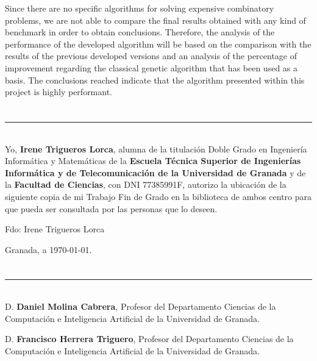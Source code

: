 Since there are no specific algorithms for solving expensive combinatory problems, we are not able to compare the final results obtained with any kind of benchmark in order to obtain conclusions. 
Therefore, the analysis of the performance of the developed algorithm will be based on the comparison with the results of the previous developed versions and an analysis of the percentage of improvement regarding the classical genetic algorithm that has been used as a basis. 
The conclusions reached indicate that the algorithm presented within this project is highly performant.

\chapter*{}
\thispagestyle{empty}

\noindent\rule[-1ex]{\textwidth}{2pt}\\[4.5ex]

Yo, \textbf{Irene Trigueros Lorca}, alumna de la titulación Doble Grado en Ingeniería Informática y Matemáticas de la \textbf{Escuela Técnica Superior de Ingenierías Informática y de Telecomunicación de la Universidad de Granada} y de la \textbf{Facultad de Ciencias}, con DNI 77385991F, autorizo la
ubicación de la siguiente copia de mi Trabajo Fin de Grado en la biblioteca de ambos centro para que pueda ser consultada por las personas que lo deseen.

\vspace{6cm}

\noindent Fdo: Irene Trigueros Lorca

\vspace{2cm}

\begin{flushright}
Granada, a \today.
\end{flushright}


\chapter*{}
\thispagestyle{empty}

\noindent\rule[-1ex]{\textwidth}{2pt}\\[4.5ex]

D. \textbf{Daniel Molina Cabrera}, Profesor del Departamento Ciencias de la Computación e Inteligencia Artificial de la Universidad de Granada.

\vspace{0.5cm}

D. \textbf{Francisco Herrera Triguero}, Profesor del Departamento Ciencias de la Computación e Inteligencia Artificial de la Universidad de Granada.


